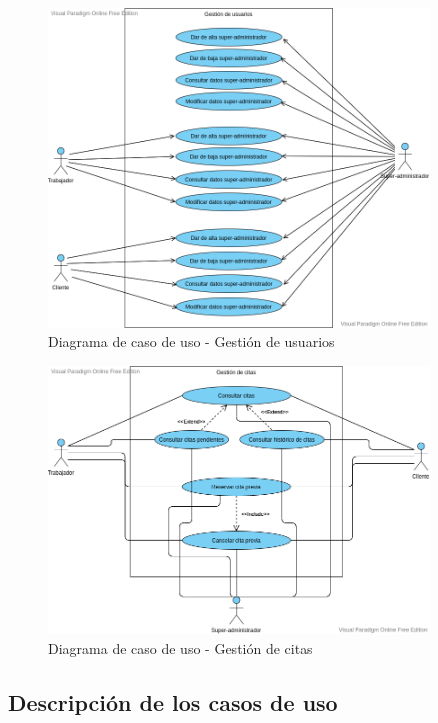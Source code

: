 \begin{figure}[H]
    \centering
    \includegraphics[width=0.9\textwidth]{images/Gestion_Usuarios.png}
    \caption{Diagrama de caso de uso - Gestión de usuarios}
    \label{CU1}
\end{figure}

\begin{figure}[H]
    \centering
    \includegraphics[width=0.9\textwidth]{images/Gestion_Citas.png}
    \caption{Diagrama de caso de uso - Gestión de citas}
    \label{CU1}
\end{figure}

\subsection{Descripción de los casos de uso}

